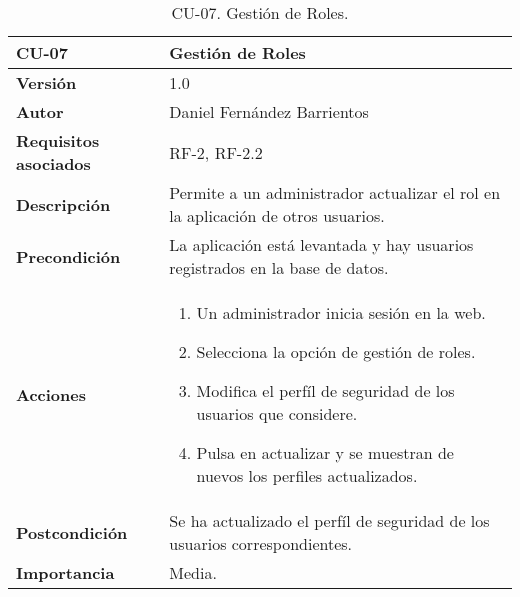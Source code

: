 \begin{table}[p]
	\centering
	\begin{tabularx}{\linewidth}{ p{} p{} }
		\toprule
		\textbf{CU-07}    & \textbf{Gestión de Roles}\\
		\toprule
		\textbf{Versión}              & 1.0    \\
		\textbf{Autor}                & Daniel Fernández Barrientos \\
		\textbf{Requisitos asociados} & RF-2, RF-2.2 \\
		\textbf{Descripción}          & Permite a un administrador actualizar el rol en la aplicación de otros usuarios. \\
		\textbf{Precondición}         & La aplicación está levantada y hay usuarios registrados en la base de datos. \\
		\textbf{Acciones}             &
		\begin{enumerate}
			\def\labelenumi{\arabic{enumi}.}
			\tightlist
			\item Un administrador inicia sesión en la web.
			\item Selecciona la opción de gestión de roles.
			\item Modifica el perfíl de seguridad de los usuarios que considere.
			\item Pulsa en actualizar y se muestran de nuevos los perfiles actualizados.
		\end{enumerate}\\
		\textbf{Postcondición}        & Se ha actualizado el perfíl de seguridad de los usuarios correspondientes. \\
		\textbf{Importancia}          & Media. \\
		\bottomrule
	\end{tabularx}
	\caption{CU-07. Gestión de Roles.}
\end{table}

